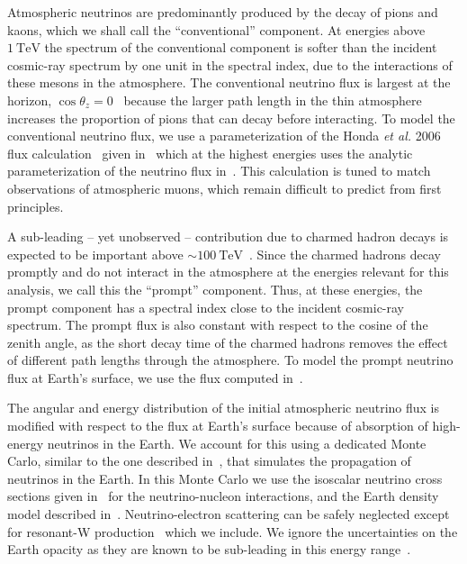 Atmospheric neutrinos are predominantly produced by the decay of pions and kaons, which we shall call the ``conventional'' component.
At energies above $\SI{1}\TeV$ the spectrum of the conventional component is softer than the incident cosmic-ray spectrum by one unit in the spectral index, due to the interactions of these mesons in the atmosphere.
The conventional neutrino flux is largest at the horizon, $\cos\theta_z=0$~\cite{Gaisser:2002jj,Barr:2004br,Honda:2006qj,Petrova:2012qf} because the larger path length in the thin atmosphere increases the proportion of pions that can decay before interacting.
To model the conventional neutrino flux, we use a parameterization of the Honda {\it{}et al.} 2006 flux calculation~\cite{Honda:2006qj} given in~\cite{Montaruli:2011as} which at the highest energies uses the analytic parameterization of the neutrino flux in~\cite{Gaisser:2002jj}.
This calculation is tuned to match observations of atmospheric muons, which remain difficult to predict from first principles.

A sub-leading -- yet unobserved -- contribution due to charmed hadron decays is expected to be important above $\sim\SI{100}\TeV$~\cite{Bhattacharya:2015jpa}.
Since the charmed hadrons decay promptly and do not interact in the atmosphere at the energies relevant for this analysis, we call this the ``prompt'' component.
Thus, at these energies, the prompt component has a spectral index close to the incident cosmic-ray spectrum.
The prompt flux is also constant with respect to the cosine of the zenith angle, as the short decay time of the charmed hadrons removes the effect of different path lengths through the atmosphere.
To model the prompt neutrino flux at Earth's surface, we use the flux computed in~\cite{Bhattacharya:2015jpa}.

The angular and energy distribution of the initial atmospheric neutrino flux is modified with respect to the flux at Earth's surface because of absorption of high-energy neutrinos in the Earth.
We account for this using a dedicated Monte Carlo, similar to the one described in~\cite{Gazizov:2004va}, that simulates the propagation of neutrinos in the Earth.
In this Monte Carlo we use the isoscalar neutrino cross sections given in~\cite{CooperSarkar:2011pa} for the neutrino-nucleon interactions, and the Earth density model described in~\cite{Dziewonski:1981xy}.
Neutrino-electron scattering can be safely neglected except for resonant-W production~\cite{Glashow:1960zz} which we include.
We ignore the uncertainties on the Earth opacity as they are known to be sub-leading in this energy range~\cite{Gandhi:1995tf,CooperSarkar:2011pa,Vincent:2017svp}.

